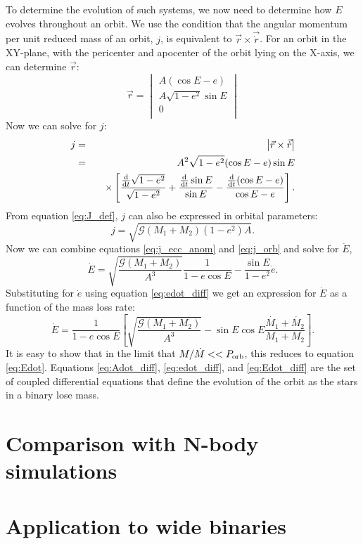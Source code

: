 \documentclass{emulateapj}
\begin{document}
To determine the evolution of such systems, we now need to determine how $E$ evolves throughout an orbit. We use the condition that the angular momentum per unit reduced mass of an orbit, $j$, is equivalent to $\vec{r} \times \vec{\dot{r}}$. For an orbit in the XY-plane, with the pericenter and apocenter of the orbit lying on the X-axis, we can determine $\vec{r}$:
\begin{equation}
\vec{r} =
  \begin{vmatrix}
    A (\cos E - e ) \\
    A \sqrt{1-e^2} \sin E \\
    0 \\        
  \end{vmatrix} 
\end{equation}
Now we can solve for $j$:
\begin{eqnarray}
j &=& \begin{vmatrix} \vec{r} \times \vec{\dot{r}} \end{vmatrix} \nonumber \\
 &=& A^2 \sqrt{1-e^2} (\cos E - e) \sin E \nonumber \\
 &\qquad& \times \left[ \frac{\frac{\rm d}{{\rm d}t} \sqrt{1-e^2}}{\sqrt{1-e^2}} + \frac{\frac{\rm d}{{\rm d}t}\sin E }{\sin E} - \frac{\frac{\rm d}{{\rm d}t}(\cos E - e)}{\cos E - e} \right]. \label{eq:j_ecc_anom}
\end{eqnarray}
From equation \ref{eq:J_def}, $j$ can also be expressed in orbital parameters:
\begin{equation}
j = \sqrt{\mathcal{G} (M_1 + M_2) (1-e^2) A}. \label{eq:j_orb}
\end{equation}
Now we can combine equations \ref{eq:j_ecc_anom} and \ref{eq:j_orb} and solve for $\dot{E}$, 
\begin{equation}
\dot{E} = \sqrt{\frac{\mathcal{G} (M_1 + M_2)}{A^3}} \frac{1}{1 - e \cos E} - \frac{\sin E}{1 - e^2} \dot{e}. \label{eq:E_dot}
\end{equation}
Substituting for $\dot{e}$ using equation \ref{eq:edot_diff} we get an expression for $\dot{E}$ as a function of the mass loss rate:
\begin{equation}
\dot{E} = \frac{1}{1-e \cos E} \left[ \sqrt{\frac{\mathcal{G} (M_1 + M_2)}{A^3}} - \sin E \cos E \frac{\dot{M_1} + \dot{M_2}}{M_1 + M_2} \right]. \label{eq:Edot_diff}
\end{equation} 
It is easy to show that in the limit that $M/\dot{M} << P_{\rm orb}$, this reduces to equation \ref{eq:Edot}. Equations \ref{eq:Adot_diff}, \ref{eq:edot_diff}, and \ref{eq:Edot_diff} are the set of coupled differential equations that define the evolution of the orbit as the stars in a binary lose mass. 



\section{Comparison with N-body simulations}



\section{Application to wide binaries}





\acknowledgments


\clearpage
\setlength{\baselineskip}{0.6\baselineskip}

\setlength{\baselineskip}{1.667\baselineskip}
\end{document}
